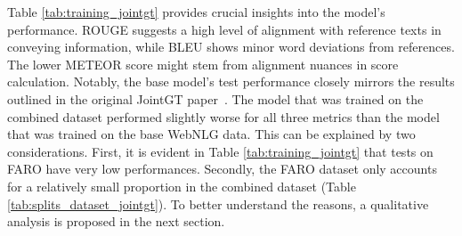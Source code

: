 \documentclass[
hf, %
]{ceurart}
\begin{document}
Table \ref{tab:training_jointgt} provides crucial insights into the model's performance. ROUGE suggests a high level of alignment with reference texts in conveying information, while BLEU shows minor word deviations from references. The lower METEOR score might stem from alignment nuances in score calculation. Notably, the base model's test performance closely mirrors the results outlined in the original JointGT paper~\cite{JointGT}.
The model that was trained on the combined dataset performed slightly worse for all three metrics than the model that was trained on the base WebNLG data. This can be explained by two considerations. First, it is evident in Table \ref{tab:training_jointgt} that tests on FARO have very low performances. Secondly, the FARO dataset only accounts for a relatively small proportion in the combined dataset (Table \ref{tab:splits_dataset_jointgt}). To better understand the reasons, a qualitative analysis is proposed in the next section.
\end{document}

